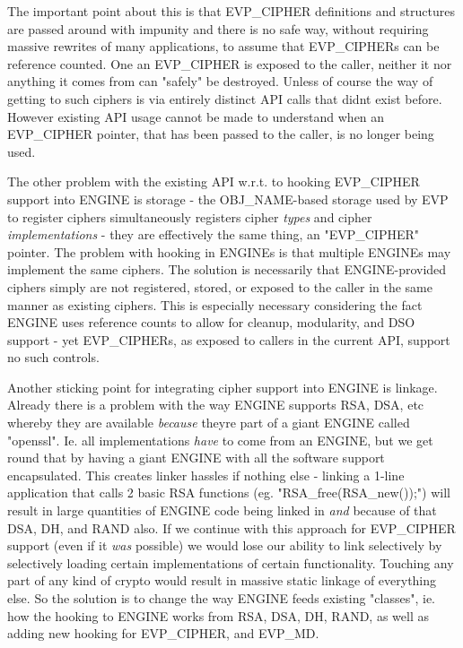 The important point about this is that EVP\+\_\+\+CIPHER definitions and structures are passed around with impunity and there is no safe way, without requiring massive rewrites of many applications, to assume that EVP\+\_\+\+CIPHERs can be reference counted. One an EVP\+\_\+\+CIPHER is exposed to the caller, neither it nor anything it comes from can "{}safely"{} be destroyed. Unless of course the way of getting to such ciphers is via entirely distinct API calls that didn\textquotesingle{}t exist before. However existing API usage cannot be made to understand when an EVP\+\_\+\+CIPHER pointer, that has been passed to the caller, is no longer being used.

The other problem with the existing API w.\+r.\+t. to hooking EVP\+\_\+\+CIPHER support into ENGINE is storage -\/ the OBJ\+\_\+\+NAME-\/based storage used by EVP to register ciphers simultaneously registers cipher {\itshape types} and cipher {\itshape implementations} -\/ they are effectively the same thing, an "{}\+EVP\+\_\+\+CIPHER"{} pointer. The problem with hooking in ENGINEs is that multiple ENGINEs may implement the same ciphers. The solution is necessarily that ENGINE-\/provided ciphers simply are not registered, stored, or exposed to the caller in the same manner as existing ciphers. This is especially necessary considering the fact ENGINE uses reference counts to allow for cleanup, modularity, and DSO support -\/ yet EVP\+\_\+\+CIPHERs, as exposed to callers in the current API, support no such controls.

Another sticking point for integrating cipher support into ENGINE is linkage. Already there is a problem with the way ENGINE supports RSA, DSA, etc whereby they are available {\itshape because} they\textquotesingle{}re part of a giant ENGINE called "{}openssl"{}. Ie. all implementations {\itshape have} to come from an ENGINE, but we get round that by having a giant ENGINE with all the software support encapsulated. This creates linker hassles if nothing else -\/ linking a 1-\/line application that calls 2 basic RSA functions (eg. "{}\+RSA\+\_\+free(\+RSA\+\_\+new());"{}) will result in large quantities of ENGINE code being linked in {\itshape and} because of that DSA, DH, and RAND also. If we continue with this approach for EVP\+\_\+\+CIPHER support (even if it {\itshape was} possible) we would lose our ability to link selectively by selectively loading certain implementations of certain functionality. Touching any part of any kind of crypto would result in massive static linkage of everything else. So the solution is to change the way ENGINE feeds existing "{}classes"{}, ie. how the hooking to ENGINE works from RSA, DSA, DH, RAND, as well as adding new hooking for EVP\+\_\+\+CIPHER, and EVP\+\_\+\+MD.

